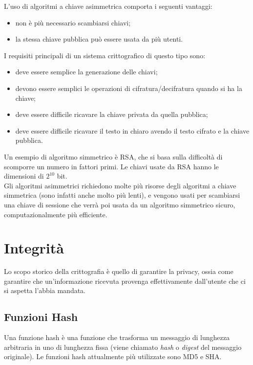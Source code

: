 \documentclass[a4paper, 11pt]{article}
\begin{document}
\begin{multicols}{2}
		L'uso di algoritmi a chiave asimmetrica comporta i seguenti vantaggi:
		\begin{itemize}
			\item non è più necessario scambiarsi chiavi;
			\item la stessa chiave pubblica può essere usata da più utenti.
		\end{itemize}
	
		I requisiti principali di un sistema crittografico di questo tipo sono:
		\begin{itemize}
			\item deve essere semplice la generazione delle chiavi;
			\item devono essere semplici le operazioni di cifratura/decifratura quando si ha la chiave;
			\item deve essere difficile ricavare la chiave privata da quella pubblica;
			\item deve essere difficile ricavare il testo in chiaro avendo il testo cifrato e la chiave pubblica.
		\end{itemize}
		Un esempio di algoritmo simmetrico è RSA, che si basa sulla difficoltà di scomporre un numero in fattori primi. Le chiavi usate da RSA hanno le dimensioni di $2^{10}$ bit. \\
		
		Gli algoritmi asimmetrici richiedono molte più risorse degli algoritmi a chiave simmetrica (sono infatti anche molto più lenti), e vengono usati per scambiarsi una chiave di sessione che verrà poi usata da un algoritmo simmetrico sicuro, computazionalmente più efficiente.
		
		\section{Integrità}
		Lo scopo storico della crittografia è quello di garantire la privacy, ossia come garantire che un'informazione ricevuta provenga effettivamente dall'utente che ci si aspetta l'abbia mandata.
		
		\subsection{Funzioni Hash}
		Una funzione hash è una funzione che trasforma un messaggio di lunghezza arbitraria in uno di lunghezza fissa (viene chiamato \textit{hash} o \textit{digest} del messaggio originale). Le funzioni hash attualmente più utilizzate sono MD5 e SHA.
		

\end{multicols}
\end{document}

